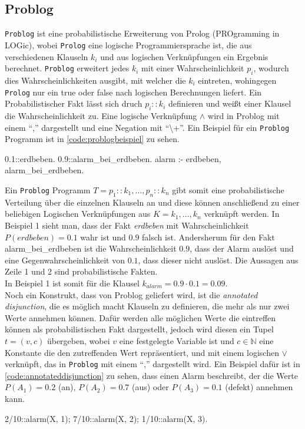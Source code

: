 \documentclass[german,version-2020-11]{uzl-thesis}
\begin{document}
\subsection{Problog}
\texttt{Problog} ist eine probabilistische Erweiterung von Prolog (PROgramming in LOGic), wobei \texttt{Prolog} eine logische Programmiersprache ist, die aus verschiedenen Klauseln $k_i$ und aus logischen Verknüpfungen ein Ergebnis berechnet. \texttt{Problog} erweitert jedes $k_i$ mit einer Wahrscheinlichkeit $p_i$, wodurch dies Wahrscheinlichkeiten ausgibt, mit welcher die $k_i$ eintreten, wohingegen \texttt{Prolog} nur ein true oder false nach logischen Berechnungen liefert. Ein Probabilistischer Fakt lässt sich druch $p_i :: k_i$ definieren und weißt einer Klausel die Wahrscheinlichkeit zu. Eine logische Verknüpfung $\land$ wird in Problog mit einem \enquote{,} dargestellt und eine Negation mit  \enquote{\textbackslash+}. Ein Beispiel für ein \texttt{Problog} Programm ist in \autoref{code:problogbeispiel} zu sehen.
\begin{Pseudocode}[caption={Beispiel Problog Programm}, label={code:problogbeispiel}, numbers=left]
0.1::erdbeben.
0.9::alarm_bei_erdbeben.
alarm :- erdbeben, alarm_bei_erdbeben.
\end{Pseudocode} 
Ein \texttt{Problog} Programm $T = {p_1 :: k_1, \dots, p_n :: k_n}$ gibt somit eine probabilistische Verteilung über die einzelnen Klauseln an und diese können anschließend zu einer beliebigen Logischen Verknüpfungen aus $K = {k_1 , \dots , k_n}$ verknüpft werden. In Beispiel 1 sieht man, dass der Fakt \textit{erdbeben} mit Wahrscheinlichkeit $ P(erdbeben) = 0.1$ wahr ist und $0.9$ falsch ist. Andersherum für den Fakt alarm\_bei\_erdbeben ist die Wahrscheinlichkeit $0.9$, dass der Alarm auslöst und eine Gegenwahrscheinlichkeit von $0.1$, dass dieser nicht auslöst. Die Aussagen aus Zeile 1 und 2 sind probabilistische Fakten.\\  In Beispiel 1 ist somit für die Klausel $k_{alarm} = 0.9 \cdot 0.1 = 0.09  $. \cite{4}\cite{5} \\ 
Noch ein Konstrukt, dass von Problog geliefert wird, ist die \textit{annotated disjunction}, die es möglich macht Klauseln zu definieren, die mehr als nur zwei Werte annehmen können. Dafür werden alle möglichen Werte die eintreffen können als probabilistischen Fakt dargestellt, jedoch wird diesen ein Tupel $t = (v,c) $ übergeben, wobei $v$ eine festgelegte Variable ist und $c \in \mathbb{N}$ eine Konstante die den zutreffenden Wert repräsentiert, und  mit einem logischen $\lor$ verknüpft, das in \texttt{Problog} mit einem \enquote{,} dargestellt wird. Ein Beispiel dafür ist in \autoref{code:annotateddisjunction} zu sehen, dass einen Alarm beschreibt, der die Werte $P(A_1) = 0.2$ (an), $P(A_2) = 0.7$ (aus) oder $P(A_3) = 0.1$ (defekt) annehmen kann. \cite{5}
\begin{Pseudocode}[caption={Problog Beispiel \textit{annotated disjunction}}, label={code:annotateddisjunction}, numbers=left]
2/10::alarm(X, 1); 7/10::alarm(X, 2); 1/10::alarm(X, 3).
\end{Pseudocode}
\end{document}
